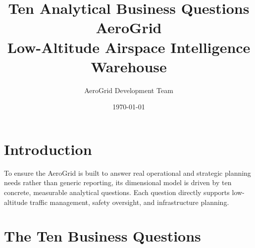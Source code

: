 \documentclass[11pt,a4paper]{article}
\title{\textbf{Ten Analytical Business Questions}\\[0.5cm] \textbf{AeroGrid}\\[0.3cm] Low-Altitude Airspace Intelligence Warehouse}
\author{AeroGrid Development Team}
\date{\today}
\begin{document}
\maketitle

\section{Introduction}
To ensure the AeroGrid is built to answer real operational and strategic planning needs rather than generic reporting, its dimensional model is driven by ten concrete, measurable analytical questions. Each question directly supports low-altitude traffic management, safety oversight, and infrastructure planning.

\section{The Ten Business Questions}
\end{document}
